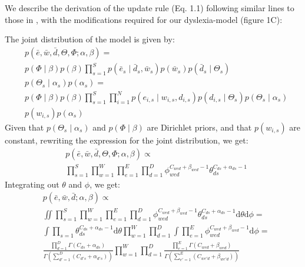 We describe the derivation of the update rule (Eq. 1.1) following similar lines to those in \citet{gs04}, with the modifications required for our dyslexia-model (figure 1C):

The joint distribution of the model is given by:
\begin{equation*}
\begin{split}
&p(\bar{e},\bar{w},\bar{d},\Theta,\Phi;\alpha,\beta) = \\
&p(\Phi\mid\beta)p(\beta)\prod_{s = 1}^S p(\bar{e}_s\mid\bar{d}_s, \bar{w}_s) p(\bar{w}_s)p(\bar{d}_s\mid\Theta_s)\\ &p(\Theta_s\mid\alpha_s)p(\alpha_s) = \\
&p(\Phi\mid\beta) p(\beta) \prod_{s = 1}^S \prod_{i=1}^N p(e_{i, s} \mid w_{i, s}, d_{i, s}) p(d_{i, s}\mid\Theta_s) p(\Theta_s\mid\alpha_s)\\
&p(w_{i, s}) p(\alpha_s)
\end{split}
\end{equation*}
Given that $p(\Theta_s\mid\alpha_s)$ and $p(\Phi\mid\beta)$ are Dirichlet priors, and that $p(w_{i, s})$ are constant, rewriting the expression for the joint distribution, we get:
\begin{equation*}
\begin{split}
&p(\bar{e}, \bar{w}, \bar{d}, \Theta, \Phi; \alpha, \beta) \propto \\
&\prod_{s=1}^S \prod_{w=1}^W \prod_{e=1}^E \prod_{d = 1}^D \phi_{wed}^{C_{wed} + \beta_{wed} - 1} \theta_{ds}^{C_{ds} + \alpha_{ds} - 1}
\end{split}
\end{equation*}
Integrating out $\theta$ and $\phi$, we get:
\begin{equation*}
\begin{split}
&p(\bar{e},\bar{w},\bar{d};\alpha,\beta) \propto \\
&\iint \prod_{s=1}^S \prod_{w=1}^W \prod_{e=1}^E \prod_{d = 1}^D  \phi_{wed}^{C_{wed} + \beta_{wed} - 1} \theta_{ds}^{C_{ds} + \alpha_{ds} - 1} \mathrm{d}\theta \mathrm{d}\phi = \\
&\int \prod_{s=1} \theta_{ds}^{C_{ds} + \alpha_{ds} - 1} \mathrm{d}\theta \prod_{w=1}^W \prod_{d = 1}^D \int\prod_{e=1}^E \phi_{wed}^{C_{wed} + \beta_{wed} - 1} \mathrm{d}\phi = \\
&\frac{\prod_{d = 1}^D\Gamma(C_{ds} + \alpha_{ds})}{\Gamma(\sum_{d' = 1}^D (C_{d's} + \alpha_{d's}))}\prod_{w=1}^W\prod_{d = 1}^D \frac{\prod_{e = 1}^E\Gamma(C_{wed} + \beta_{wed})}{\Gamma(\sum_{e' = 1}^E (C_{we'd} + \beta_{we'd}))}
\end{split}
\end{equation*}
